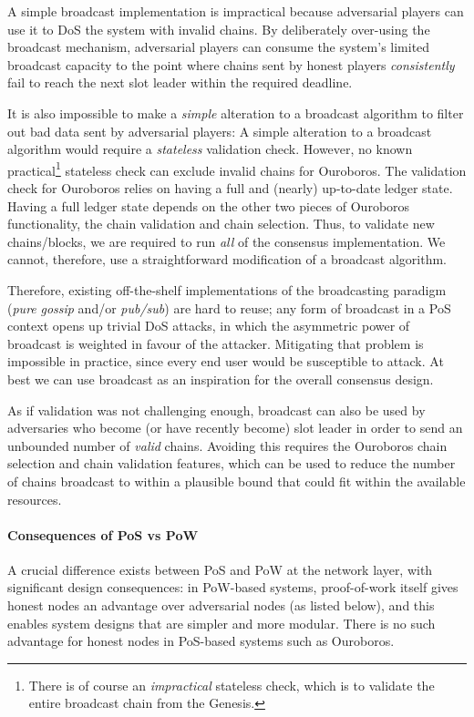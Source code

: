 \documentclass[11pt,a4paper]{article}
\begin{document}
A simple broadcast implementation is impractical because adversarial
players can use it to DoS the system with invalid chains. By
deliberately over-using the broadcast mechanism, adversarial players can
consume the system's limited broadcast capacity to the point where
chains sent by honest players \emph{consistently} fail to reach the next
slot leader within the required deadline.

It is also impossible to make a \emph{simple} alteration to a broadcast
algorithm to filter out bad data sent by adversarial players: A simple
alteration to a broadcast algorithm would require a \emph{stateless}
validation check. However, no known practical\footnote{There is of
  course an \emph{impractical} stateless check, which is to validate the
  entire broadcast chain from the Genesis.} stateless check can exclude
invalid chains for Ouroboros. The validation check for Ouroboros relies
on having a full and (nearly) up-to-date ledger state. Having a full
ledger state depends on the other two pieces of Ouroboros functionality,
the chain validation and chain selection. Thus, to validate new
chains/blocks, we are required to run \emph{all} of the consensus
implementation. We cannot, therefore, use a straightforward modification
of a broadcast algorithm.

Therefore, existing off-the-shelf implementations of the broadcasting
paradigm (\emph{pure} \emph{gossip} and/or \emph{pub/sub}) are hard to
reuse; any form of broadcast in a PoS context opens up trivial DoS attacks, in
which the asymmetric power of broadcast is weighted in favour of the
attacker. Mitigating that problem is impossible in practice, since every
end user would be susceptible to attack. At best we can use broadcast as
an inspiration for the overall consensus design.

As if validation was not challenging enough, broadcast can also be used
by adversaries who become (or have recently become) slot leader in order
to send an unbounded number of \emph{valid} chains. Avoiding this
requires the Ouroboros chain selection and chain validation features,
which can be used to reduce the number of chains broadcast to within a
plausible bound that could fit within the available resources.

\paragraph{Consequences of PoS vs PoW}

A crucial difference exists between PoS and PoW at the network layer,
with significant design consequences: in PoW-based systems,
proof-of-work itself gives honest nodes an advantage over adversarial
nodes (as listed below), and this enables system designs that are
simpler and more modular. There is no such advantage for honest nodes in
PoS-based systems such as Ouroboros.
\end{document}
